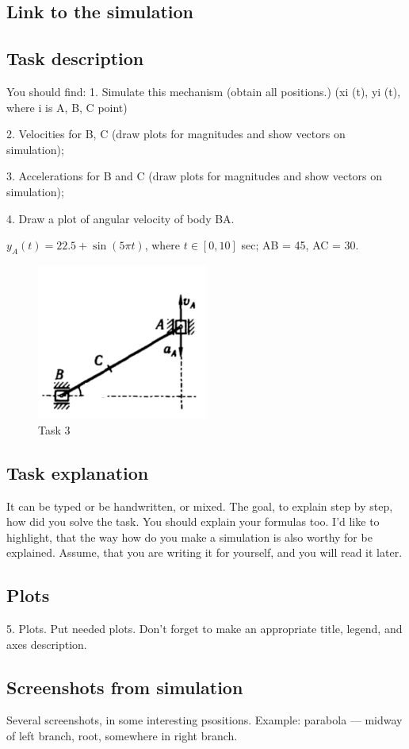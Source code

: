 \subsection{Link to the simulation}

\subsection{Task description}
You should find:
1. Simulate this mechanism (obtain all positions.)
(xi (t), yi (t), where i is A, B, C point)

2. Velocities for B, C (draw plots for magnitudes and
show vectors on simulation);

3. Accelerations for B and C (draw plots for
magnitudes and show vectors on simulation);

4. Draw a plot of angular velocity of body BA.

$y_A(t) = 22.5 + \sin(5\pi t)$, where $t \in [0, 10]$ sec; AB = 45, AC = 30.

\begin{figure}[H]
    \centering
    \includegraphics[width=0.5\textwidth]{Task3.png}
    \caption{Task 3}
\end{figure}


\subsection{Task explanation}
It can be typed or be handwritten, or mixed. The goal, to explain step by step, how did
you solve the task. You should explain your formulas too.
I’d like to highlight, that the way how do you make a simulation is also worthy for be explained.
Assume, that you are writing it for yourself, and you will read it later.

\subsection{Plots}
5. Plots. Put needed plots. Don’t forget to make an appropriate title, legend, and axes description.
\subsection{Screenshots from simulation}

Several screenshots, in some interesting psositions. Example: parabola —
midway of left branch, root, somewhere in right branch.


